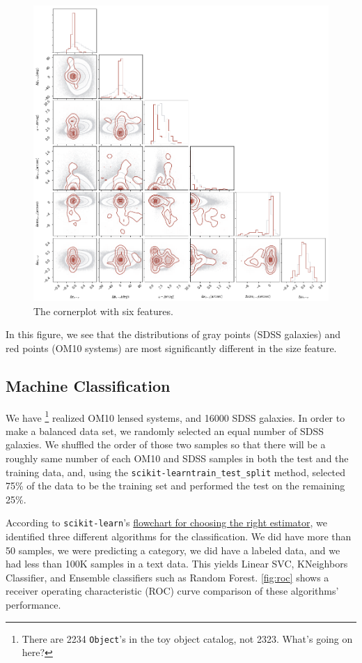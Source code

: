 \documentclass[\docopts]{\docclass}
\def\Object{\texttt{Object}\xspace}
\def\sklearn{\texttt{scikit-learn}\xspace}
\begin{document}
\begin{figure}
\includegraphics[width=0.9\columnwidth]{cornerplot.png}
\caption{The cornerplot with six features.}
 \label{fig:cornerplot}
\end{figure}

In this figure, we see that the distributions of gray points (SDSS
galaxies) and  red points (OM10 systems) are most significantly
different in the size feature.


\subsection{Machine Classification}
\label{subsec:classification}

We have \footnote{There are 2234 \Object's in the toy object
catalog, not 2323. What's going on here?} realized OM10 lensed systems,
and 16000 SDSS galaxies. In order to make a balanced data set, we
randomly selected an equal number of SDSS galaxies. We shuffled the
order of those two samples so that there will be a roughly same number
of each OM10 and SDSS samples in both the test and the training data,
and, using the \sklearn \texttt{train\_test\_split} method, selected
75\% of the data to be the training set and performed the test on the
remaining 25\%.

According to \sklearn's
\href{http://scikit-learn.org/stable/tutorial/machine_learning_map/index.html}
{flowchart for choosing the right estimator}, we identified three
different algorithms for the classification. We did have more than 50
samples, we were predicting a category, we did have a labeled data, and
we had less than 100K samples in a text data. This yields Linear SVC,
KNeighbors Classifier, and Ensemble classifiers such as Random Forest.
\autoref{fig:roc} shows a receiver operating characteristic (ROC) curve
comparison of these algorithms' performance.
\end{document}
